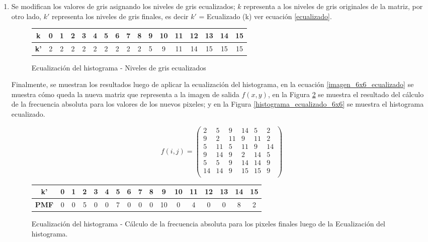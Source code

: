 \begin{enumerate}
  \item Se modifican los valores de gris asignando los niveles de gris ecualizados; $k$ representa a los niveles de gris originales de la matriz, por otro lado, $k'$ representa los niveles de gris finales, es decir $k'$ = Ecualizado (k) ver ecuación \ref{ecualizado}.
  
    \begin{figure}[h]
    \centering
        \begin{tabular}{| c | c | c | c | c | c | c | c | c |c | c | c | c | c | c | c | c |} \hline
                \textbf{k}  & 0 & 1 & 2 & 3 & 4 & 5 & 6 & 7 & 8 & 9 & 10 & 11 & 12 & 13 & 14 & 15 \\ \hline
               \textbf{k'} & 2 & 2 & 2 & 2 & 2 & 2 & 2 & 2 & 2 & 5 & 9 & 11 & 14 & 15 & 15 & 15 \\ \hline
        \end{tabular}
        \caption{Ecualización del histograma - Niveles de gris ecualizados}
        \label{tabla_ecualizados}
    \end{figure}
    
   Finalmente, se muestran los resultados luego de aplicar la ecualización del histograma, en la ecuación \ref{imagen_6x6_ecualizado} se muestra cómo queda la nueva matriz que representa a la imagen de salida $f(x,y)$, en la Figura \ref{FDA_niveles_finales} se muestra el resultado del cálculo de la frecuencia absoluta para los valores de los nuevos pixeles; y en la Figura \ref{histograma_ecualizado_6x6} se muestra el histograma ecualizado.
    
    \hfill\begin{equation}
        f(i,j) = 
         \begin{pmatrix} 
         2 & 5 & 9 & 14 & 5 & 2 \\
         9 & 2 & 11 & 9 & 11 & 2 \\
         5 & 11 & 5 & 11 & 9 & 14 \\
         9 & 14 & 9 & 2 & 14 & 5 \\
        5 & 5 & 9 & 14 & 14 & 9 \\
        14 & 14 & 9 & 15 & 15 & 9 \\
        \end{pmatrix} 
        \label{imagen_6x6_ecualizado}
    \end{equation}
      
   \hfill\begin{figure}[h!]
   \centering
        \begin{tabular}{| c | c | c | c | c | c | c | c | c |c | c | c | c | c | c | c | c |} \hline
                \textbf{k'}  & 0 & 1 & 2 & 3 & 4 & 5 & 6 & 7 & 8 & 9 & 10 & 11 & 12 & 13 & 14 & 15 \\ \hline
                \textbf{PMF} & 0 & 0 & 5 & 0 & 0 & 7 & 0 & 0 & 0 & 10 & 0 & 4 & 0 & 0 & 8 & 2 \\ \hline
        \end{tabular}
        \caption{Ecualización del histograma - Cálculo de la frecuencia absoluta para los pixeles finales luego de la Ecualización del histograma.}
        \label{FDA_niveles_finales}
    \end{figure}
    

\end{enumerate}
